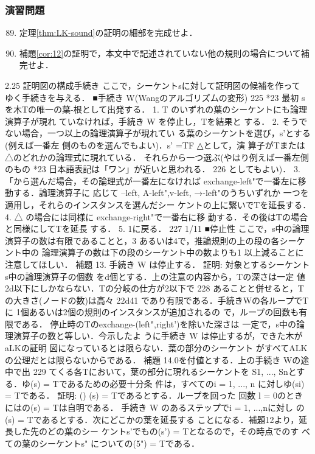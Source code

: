 \documentclass{ltjsarticle}
\theoremstyle{mystyle1}
\theoremstyle{mystyle3}
\theoremstyle{mystyle2}
\begin{document}
\subsubsection*{演習問題}
\begin{enumerate}
  \setcounter{enumi}{88}
  \item 定理\ref{thm:LK-sound}の証明の細部を完成せよ．
  \item 補題\ref{cor:12}の証明で，本文中で記述されていない他の規則の場合について補完せよ．
\end{enumerate}
2.25 証明図の構成手続き ここで，シーケントsに対して証明図の候補を作って ゆく手続きを与える．
■手続き W(Wangのアルゴリズムの変形)
225
*23 最初 sを木Tの唯一の葉-根として出発する． 1. T のいずれの葉のシーケントにも論理演算子が現れ
ていなければ，手続き W を停止し，Tを結果と する． 2. そうでない場合，一つ以上の論理演算子が現れてい
る葉のシーケントを選び，s'とする(例えば一番左 側のものを選んでもよい)．s' =TF △として，演 算子がTまたは△のどれかの論理式に現れている． それらから一つ選ぶ(やはり例えば一番左側のもの
*23 日本語表記は「ワン」が近いと思われる．
226
としてもよい)． 3. 「から選んだ場合，その論理式が一番左になければ
exchange-left"で一番左に移動する．論理演算子に 応じて --left, A-left",v-left, →-left"のうちいずれか 一つを適用し，それらのインスタンスを選んだシー
ケントの上に繋いでTを延長する． 4. △ の場合には同様に exchange-right"で一番右に移
動する．その後はTの場合と同様にしてTを延長
する． 5. 1に戻る．
227
1/11
■停止性
ここで，s中の論理演算子の数は有限であることと，3 あるいは4で，推論規則の上の段の各シーケント中の 論理演算子の数は下の段のシーケント中の数よりも1 以上減ることに注意してほしい．
補題 13. 手続き W は停止する． 証明: 対象とするシーケントs中の論理演算子の個数 をd個とする．上の注意の内容から，Tの深さは一定 値2d以下にしかならない．Tの分岐の仕方が2以下で
228
あることと併せると，Tの大きさ(ノードの数)は高々 22d41 であり有限である．手続きWの各ループでTに 1個あるいは2個の規則のインスタンスが追加されるの
で，ループの回数も有限である．
停止時のTのexchange-(left",right')を除いた深さは 一定で，s中の論理演算子の数と等しい．今示したよ うに手続き W は停止するが，できた木がaLKの証明 図になっているとは限らない．葉の部分のシーケント がすべてALKの公理だとは限らないからである．
補題 14.0を付値とする．上の手続き Wの途中で出
229
てくる各Tにおいて，葉の部分に現れるシーケントを S1, ..., Snとする．ゆ(s) = Tであるための必要十分条 件は，すべてのi = 1, ..., n に対しゆ(si) = Tである．
証明: () (s) = Tであるとする．ループを回った 回数 l = 0のときにはの(s) = Tは自明である． 手続き W のあるステップでi = 1, ...,nに対し の(s) = Tであるとする．次にどこかの葉を延長する ことになる．補題12より，延長した先のどの葉のシー ケントs'でもの(s') = Tとなるので，その時点でのす べての葉のシーケントs" についての(5") = Tである．
\end{document}
